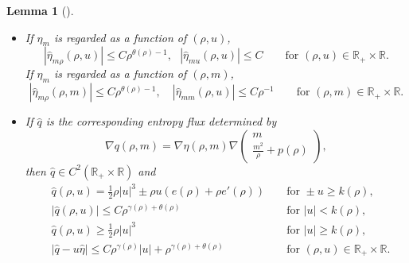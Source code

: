 \documentclass[reqno,11pt]{amsart}
\numberwithin{equation}{section}
\newtheorem{lemma}[theorem]{Lemma}
\theoremstyle{definition}
\begin{document}
\begin{lemma}[]
\begin{itemize}
\item[{\rm(c)}] If $\hat{\eta}_m$ is regarded as a function of $(\rho,u)$,
 \begin{equation*}
 |\hat{\eta}_{m \rho}(\rho,u)| \leq C \rho^{\theta(\rho) - 1}, \,\,\,\,
     |\hat{\eta}_{m u}(\rho,u)| \leq C
 \qquad\mbox{for $(\rho,u) \in \mathbb{R}_+ \times \mathbb{R}$}.
  \end{equation*}
  If $\hat{\eta}_m$ is regarded as a function of $(\rho,m)$,
\begin{equation*}
 |\hat{\eta}_{m \rho}(\rho,m)| \leq C \rho^{\theta(\rho) - 1}, \quad |\hat{\eta}_{m m}(\rho,u)| \leq C\rho^{-1} \qquad\mbox{for $(\rho,m) \in \mathbb{R}_+ \times \mathbb{R}$}.
 \end{equation*}
\item[{\rm(d)}] If $\hat{q}$ is the corresponding entropy flux determined by
 \begin{equation*}
 \nabla q(\rho,m) = \nabla \eta (\rho,m) \nabla
 \begin{pmatrix}
     m \\
     \frac{m^2}{\rho} + p(\rho)
 \end{pmatrix},
\end{equation*}
then $\hat{q} \in C^2(\mathbb{R}_+ \times \mathbb{R})$ and
 \begin{align*}
 &\hat{q}(\rho,u) = \frac{1}{2}\rho |u|^3 \pm \rho u (e(\rho) + \rho e'(\rho)) && \text{ for } \pm u \geq k(\rho), \\
  &|\hat{q}(\rho,u)| \leq C \rho^{\gamma(\rho) + \theta(\rho)} && \text{ for } |u| < k(\rho), \\
 &\hat{q}(\rho,u) \geq \frac{1}{2} \rho |u|^3 && \text{ for } |u| \geq k(\rho), \\
  &|\hat{q} - u \hat{\eta}| \leq C \rho^{\gamma(\rho)}|u| + \rho^{\gamma(\rho) + \theta(\rho)}
     && \text{ for } (\rho,u) \in \mathbb{R}_+ \times \mathbb{R}.
 \end{align*}
    \end{itemize}
\end{lemma}
\end{document}

